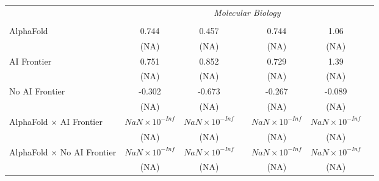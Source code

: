 \begin{tabular}{lcccccc}
 & \multicolumn{6}{c}{\textit{Molecular Biology}} \\ \\
   AlphaFold                                                                  & 0.744                  & 0.457                  &                        & 0.744                  & 1.06                   &   \\   
                                                                              & (NA)                   & (NA)                   &                        & (NA)                   & (NA)                   &   \\   
   AI Frontier                                                                & 0.751                  & 0.852                  &                        & 0.729                  & 1.39                   &   \\   
                                                                              & (NA)                   & (NA)                   &                        & (NA)                   & (NA)                   &   \\   
   No AI Frontier                                                             & -0.302                 & -0.673                 &                        & -0.267                 & -0.089                 &   \\   
                                                                              & (NA)                   & (NA)                   &                        & (NA)                   & (NA)                   &   \\   
   AlphaFold $\times$ AI Frontier                                             & $NaN\times 10^{-Inf}$  & $NaN\times 10^{-Inf}$  &                        & $NaN\times 10^{-Inf}$  & $NaN\times 10^{-Inf}$  &   \\   
                                                                              & (NA)                   & (NA)                   &                        & (NA)                   & (NA)                   &   \\   
   AlphaFold $\times$ No AI Frontier                                          & $NaN\times 10^{-Inf}$  & $NaN\times 10^{-Inf}$  &                        & $NaN\times 10^{-Inf}$  & $NaN\times 10^{-Inf}$  &   \\   
                                                                              & (NA)                   & (NA)                   &                        & (NA)                   & (NA)                   &   \\   

\end{tabular}
